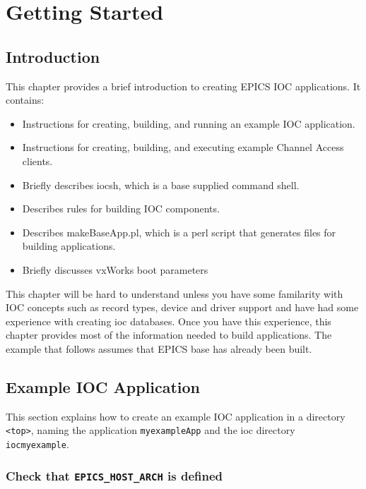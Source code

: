 \chapter{Getting Started}

\section{Introduction}

This chapter provides a brief introduction to creating EPICS IOC applications. It contains:

\begin{itemize}
\item Instructions for creating, building, and running an example IOC application.

\item Instructions for creating, building, and executing example Channel Access clients.

\item Briefly describes iocsh, which is a base supplied command shell.

\item Describes rules for building IOC components.

\item Describes makeBaseApp.pl, which is a perl script that generates files for building applications.

\item Briefly discusses vxWorks boot parameters
\end{itemize}

This chapter will be hard to understand unless you have some familarity with IOC concepts such as record types, device and driver support and have had some experience with creating ioc databases.
Once you have this experience, this chapter provides most of the information needed to build applications.
The example that follows assumes that EPICS base has already been built.

\section{Example IOC Application}
\label{Example IOC Application}

This section explains how to create an example IOC application in a directory \verb|<top>|, naming the application 
\verb|myexampleApp| and the ioc directory \verb|iocmyexample|.

\subsection{Check that \texttt{EPICS\_HOST\_ARCH} is defined}

